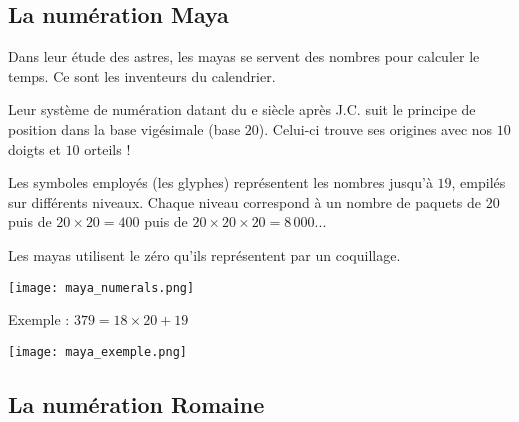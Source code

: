 \subsection{La numération Maya}

\begin{His}
Dans leur étude des astres, les mayas se servent des nombres pour calculer le temps. Ce sont les inventeurs du calendrier.

 Leur système de numération datant du e siècle après J.C. suit le principe de position dans la base vigésimale (base $20$). Celui-ci trouve ses origines avec nos $10$ doigts et $10$ orteils !  
 
 Les symboles employés (les glyphes) représentent les nombres jusqu'à $19$, empilés sur différents niveaux. Chaque niveau correspond à un nombre de paquets de $20$ puis de $20\times20=400$ puis de $20\times20\times20=8\,000$...
 
Les mayas utilisent le zéro qu'ils représentent par un coquillage.

\begin{center}
\texttt{[image: maya\_numerals.png]}
\end{center}

Exemple : $379=18\times20+19$
\begin{center}
\texttt{[image: maya\_exemple.png]}
\end{center}
\end{His}

\subsection{La numération Romaine}

